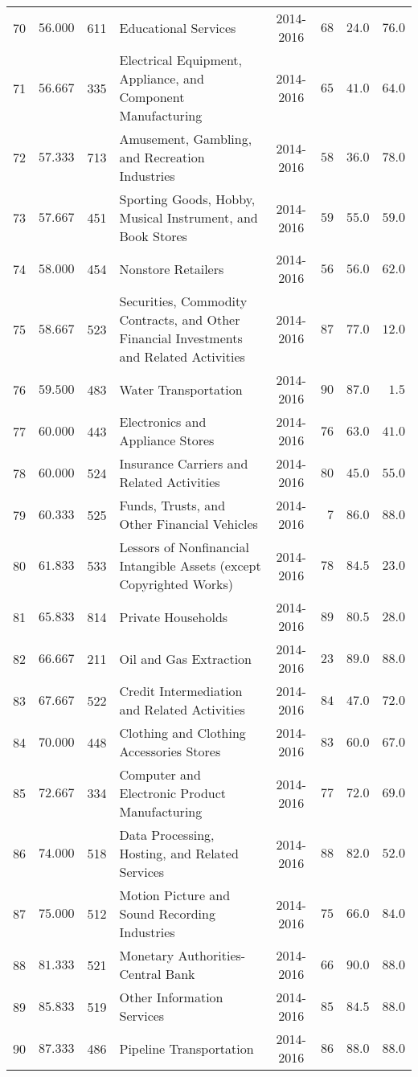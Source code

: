 \documentclass[9pt, oneside]{article}   	%
\begin{document}
\begin{longtable}{cccp{2.0in}cccc}
70  & $56.000$ & 611 & Educational Services & 2014-2016 & $68$ & $24.0$ & $76.0$ \\
71  & $56.667$ & 335 & Electrical Equipment, Appliance, and Component Manufacturing & 2014-2016 & $65$ & $41.0$ & $64.0$ \\
72  & $57.333$ & 713 & Amusement, Gambling, and Recreation Industries & 2014-2016 & $58$ & $36.0$ & $78.0$ \\
73  & $57.667$ & 451 & Sporting Goods, Hobby, Musical Instrument, and Book Stores & 2014-2016 & $59$ & $55.0$ & $59.0$ \\
74  & $58.000$ & 454 & Nonstore Retailers & 2014-2016 & $56$ & $56.0$ & $62.0$ \\
75  & $58.667$ & 523 & Securities, Commodity Contracts, and Other Financial Investments and Related Activities & 2014-2016 & $87$ & $77.0$ & $12.0$ \\
76  & $59.500$ & 483 & Water Transportation & 2014-2016 & $90$ & $87.0$ & $\phantom{0}1.5$ \\
77  & $60.000$ & 443 & Electronics and Appliance Stores & 2014-2016 & $76$ & $63.0$ & $41.0$ \\
78  & $60.000$ & 524 & Insurance Carriers and Related Activities & 2014-2016 & $80$ & $45.0$ & $55.0$ \\
79  & $60.333$ & 525 & Funds, Trusts, and Other Financial Vehicles & 2014-2016 & $\phantom{0}7$ & $86.0$ & $88.0$ \\
80  & $61.833$ & 533 & Lessors of Nonfinancial Intangible Assets (except Copyrighted Works) & 2014-2016 & $78$ & $84.5$ & $23.0$ \\
81  & $65.833$ & 814 & Private Households & 2014-2016 & $89$ & $80.5$ & $28.0$ \\
82  & $66.667$ & 211 & Oil and Gas Extraction & 2014-2016 & $23$ & $89.0$ & $88.0$ \\
83  & $67.667$ & 522 & Credit Intermediation and Related Activities & 2014-2016 & $84$ & $47.0$ & $72.0$ \\
84  & $70.000$ & 448 & Clothing and Clothing Accessories Stores & 2014-2016 & $83$ & $60.0$ & $67.0$ \\
85  & $72.667$ & 334 & Computer and Electronic Product Manufacturing & 2014-2016 & $77$ & $72.0$ & $69.0$ \\
86  & $74.000$ & 518 & Data Processing, Hosting, and Related Services & 2014-2016 & $88$ & $82.0$ & $52.0$ \\
87  & $75.000$ & 512 & Motion Picture and Sound Recording Industries & 2014-2016 & $75$ & $66.0$ & $84.0$ \\
88  & $81.333$ & 521 & Monetary Authorities-Central Bank & 2014-2016 & $66$ & $90.0$ & $88.0$ \\
89  & $85.833$ & 519 & Other Information Services & 2014-2016 & $85$ & $84.5$ & $88.0$ \\
90  & $87.333$ & 486 & Pipeline Transportation & 2014-2016 & $86$ & $88.0$ & $88.0$ \\
\hline 
\cline{1-1} \cline{2-2} \cline{3-3} \cline{4-4} \cline{5-5}  \cline{6-6} \cline{7-7} \cline{8-8}%
\hline 
\end{longtable}
\end{document}
